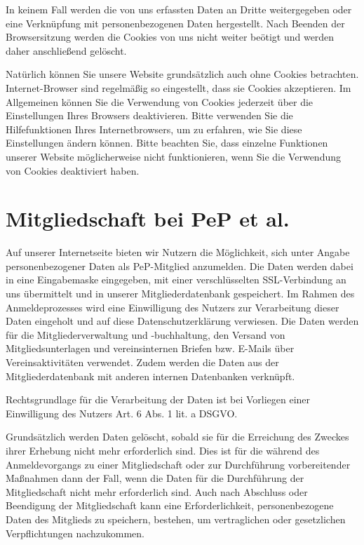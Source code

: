 \documentclass[
  fontsize=12pt,
  paper=a4,
  DIV14,
  parskip,
]{scrartcl}
\begin{document}
In keinem Fall werden die von uns erfassten Daten an Dritte weitergegeben
oder eine Verknüpfung mit personenbezogenen Daten hergestellt.
Nach Beenden der Browsersitzung werden die Cookies von uns nicht weiter
beötigt und werden daher anschließend gelöscht.

Natürlich können Sie unsere Website grundsätzlich auch ohne Cookies betrachten.
Internet-Browser sind regelmäßig so eingestellt, dass sie Cookies akzeptieren.
Im Allgemeinen können Sie die Verwendung von Cookies jederzeit über die
Einstellungen Ihres Browsers deaktivieren.
Bitte verwenden Sie die Hilfefunktionen Ihres Internetbrowsers, um zu
erfahren, wie Sie diese Einstellungen ändern können.
Bitte beachten Sie, dass einzelne Funktionen unserer Website möglicherweise
nicht funktionieren, wenn Sie die Verwendung von Cookies deaktiviert haben.

\section{Mitgliedschaft bei PeP et al.}

Auf unserer Internetseite bieten wir Nutzern die Möglichkeit, sich unter
Angabe personenbezogener Daten als PeP-Mitglied anzumelden.
Die Daten werden dabei in eine Eingabemaske eingegeben, mit einer
verschlüsselten SSL-Verbindung an uns übermittelt und in unserer
Mitgliederdatenbank gespeichert.
Im Rahmen des Anmeldeprozesses wird eine Einwilligung des Nutzers zur
Verarbeitung dieser Daten eingeholt und auf diese Datenschutzerklärung
verwiesen. 
Die Daten werden für die Mitgliederverwaltung und -buchhaltung, den Versand
von Mitgliedsunterlagen und vereinsinternen Briefen bzw. E-Mails über
Vereinsaktivitäten verwendet.
Zudem werden die Daten aus der Mitgliederdatenbank mit anderen internen
Datenbanken verknüpft.

Rechtsgrundlage für die Verarbeitung der Daten ist bei Vorliegen einer
Einwilligung des Nutzers Art. 6 Abs. 1 lit. a DSGVO.

Grundsätzlich werden Daten gelöscht, sobald sie für die Erreichung des
Zweckes ihrer Erhebung nicht mehr erforderlich sind.
Dies ist für die während des Anmeldevorgangs zu einer Mitgliedschaft oder zur
Durchführung vorbereitender Maßnahmen dann der Fall, wenn die Daten für die
Durchführung der Mitgliedschaft nicht mehr erforderlich sind.
Auch nach Abschluss oder Beendigung der Mitgliedschaft kann eine
Erforderlichkeit, personenbezogene Daten des Mitglieds zu speichern,
bestehen, um vertraglichen oder gesetzlichen Verpflichtungen nachzukommen.
\end{document}

